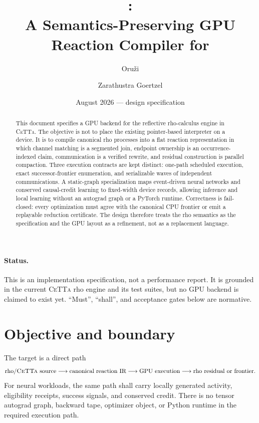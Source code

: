 \documentclass[11pt]{article}
\title{\RhoForge:\\
A Semantics-Preserving GPU Reaction Compiler for \CeTTa}
\author{Oru\v{z}i \and Zarathustra Goertzel}
\date{August 2026 --- design specification}
\newcommand{\CeTTa}{\textsc{CeTTa}}
\begin{document}
\maketitle

\begin{abstract}
This document specifies a GPU backend for the reflective rho-calculus engine
in \CeTTa.  The objective is not to place the existing pointer-based
interpreter on a device.  It is to compile canonical rho processes into a
flat reaction representation in which channel matching is a segmented join,
endpoint ownership is an occurrence-indexed claim, communication is a
verified rewrite, and residual construction is parallel compaction.  Three
execution contracts are kept distinct: one-path scheduled execution, exact
successor-frontier enumeration, and serializable waves of independent
communications.  A static-graph specialization maps event-driven neural
networks and conserved causal-credit learning to fixed-width device records,
allowing inference and local learning without an autograd graph or a PyTorch
runtime.  Correctness is fail-closed: every optimization must agree with the
canonical CPU frontier or emit a replayable reduction certificate.  The
design therefore treats the rho semantics as the specification and the GPU
layout as a refinement, not as a replacement language.
\end{abstract}

\paragraph{Status.}
This is an implementation specification, not a performance report.  It is
grounded in the current \CeTTa{} rho engine and its test suites, but no GPU
backend is claimed to exist yet.  ``Must'', ``shall'', and acceptance gates
below are normative.

\section{Objective and boundary}

The target is a direct path
\[
  \text{rho/\CeTTa{} source}
  \longrightarrow \text{canonical reaction IR}
  \longrightarrow \text{GPU execution}
  \longrightarrow \text{rho residual or frontier}.
\]
For neural workloads, the same path shall carry locally generated activity,
eligibility receipts, success signals, and conserved credit.  There is no
tensor autograd graph, backward tape, optimizer object, or Python runtime in
the required execution path.
\end{document}
